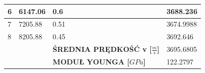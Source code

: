 \documentclass{article}
\begin{document}
\begin{table}[!htbp]
{\begin{tabular}{ll|l|l|}
\multicolumn{1}{|l|}{6}                                & 6147.06                           & 0.6                                              & 3688.236                           \\ \hline
\multicolumn{1}{|l|}{7}                                & 7205.88                           & 0.51                                             & 3674.9988                          \\ \hline
\multicolumn{1}{|l|}{8}                                & 8205.88                           & 0.45                                             & 3692.646                           \\ \hline
                                                       &                                   & \textbf{ŚREDNIA PRĘDKOŚĆ v {[}$\frac{m}{s}${]}}            & 3695.6805                          \\ \cline{3-4} 
                                                       &                                   & \textbf{MODUŁ YOUNGA {[}$GPa${]}}                  & 122.2797                           \\ \cline{3-4} 
\end{tabular}
}
\end{table}
\end{document}
